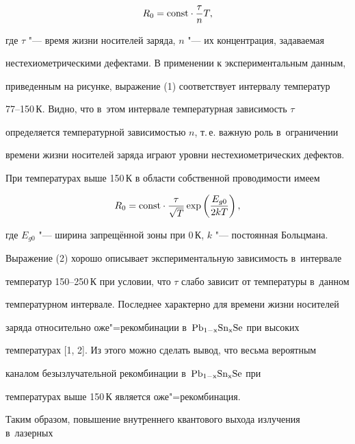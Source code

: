 \begin{equation}

R_0 = {\rm const}\cdot\frac{\tau }{n}T,

\end{equation}

где $\tau $ "--- время жизни носителей заряда, $n$ "--- их концентрация, задаваемая 

нестехиометрическими дефектами. В применении к экспериментальным данным, 

приведенным на рисунке, выражение (1) соответствует интервалу температур 

77--150\,К. Видно, что в~этом интервале температурная зависимость $\tau $ 

определяется температурной зависимостью $n$, т.\,е. важную роль в~ограничении 

времени жизни носителей заряда играют уровни нестехиометрических дефектов.







При температурах выше 150\,К в области собственной проводимости имеем

\begin{equation}

R_0 = {\rm const}\cdot\frac{\tau }{\sqrt T}\exp \left( {\frac{E_{g0} }{2kT}} \right),

\end{equation}

где $E_{g0}$ "--- ширина запрещённой зоны при 0\,К, $k$ "--- постоянная Больцмана. 

Выражение (2) хорошо описывает экспериментальную зависимость в~интервале 

температур 150--250\,К при условии, что $\tau $ слабо зависит от температуры в~данном 

температурном интервале. Последнее характерно для времени жизни носителей 

заряда относительно оже"=рекомбинации в~$\rm Pb_{1 - x}Sn_{x}Se$ при высоких 

температурах [1, 2]. Из этого можно сделать вывод, что весьма вероятным 

каналом безызлучательной рекомбинации в~$\rm Pb_{1 - x}Sn_{x}Se$ при 

температурах выше 150\,К является оже"=рекомбинация.



Таким образом, повышение внутреннего квантового выхода излучения в~лазерных 

